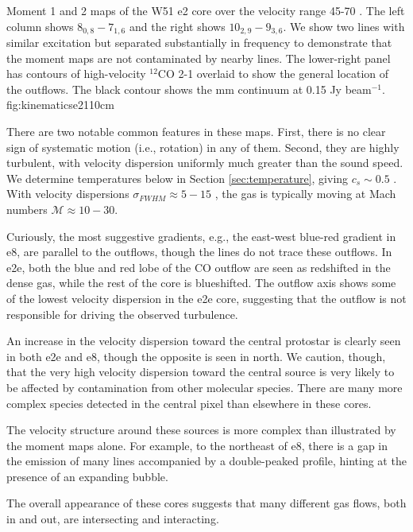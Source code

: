 \documentclass{emulateapj}
\begin{document}
{Moment 1 and 2 maps of the W51 e2 core over the velocity
range 45-70 \kms.  The left column shows \methanol $8_{0,8}-7_{1,6}$
and the right shows \methanol $10_{2,9}-9_{3,6}$.  We show two
lines with similar excitation but separated substantially in frequency
to demonstrate that the moment maps are not contaminated by nearby lines.
The lower-right panel has contours of high-velocity $^{12}$CO 2-1 overlaid
to show the general location of the outflows.  The black contour shows
the mm continuum at 0.15 Jy beam$^{-1}$.}
{fig:kinematicse2}{1}{10cm}


There are two notable common features in these maps. First, there is no clear
sign of systematic motion (i.e., rotation) in any of them.  Second, they are
highly turbulent, with velocity dispersion uniformly much greater than the
sound speed.  We determine temperatures below in Section
\ref{sec:temperature}, giving $c_s\sim0.5$ \kms.  With velocity dispersions
$\sigma_{FWHM}\approx5-15$ \kms, the gas is typically moving at Mach numbers
$\mathcal{M}\approx10-30$.

Curiously, the most suggestive gradients, e.g., the east-west blue-red gradient
in e8, are parallel to the outflows, though the \methanol lines do not trace
these outflows.  In e2e, both the blue and red lobe of the CO outflow are seen
as redshifted in the dense gas, while the rest of the core is blueshifted.
The outflow axis shows some of the lowest velocity dispersion in the e2e core,
suggesting that the outflow is not responsible for driving the observed
turbulence.

An increase in the velocity dispersion toward the central protostar is clearly
seen in both e2e and e8, though the opposite is seen in north.  We caution,
though, that the very high velocity dispersion toward the central source is
very likely to be affected by contamination from other molecular species.
There are many more complex species detected in the central pixel than
elsewhere in these cores.

The velocity structure around these sources is more complex than illustrated by
the moment maps alone.  For example, to the northeast of e8, there is a gap in
the emission of many lines accompanied by a double-peaked profile, hinting at
the presence of an expanding bubble.

The overall appearance of these cores suggests that many different gas flows,
both in and out, are intersecting and interacting.  
\end{document}
